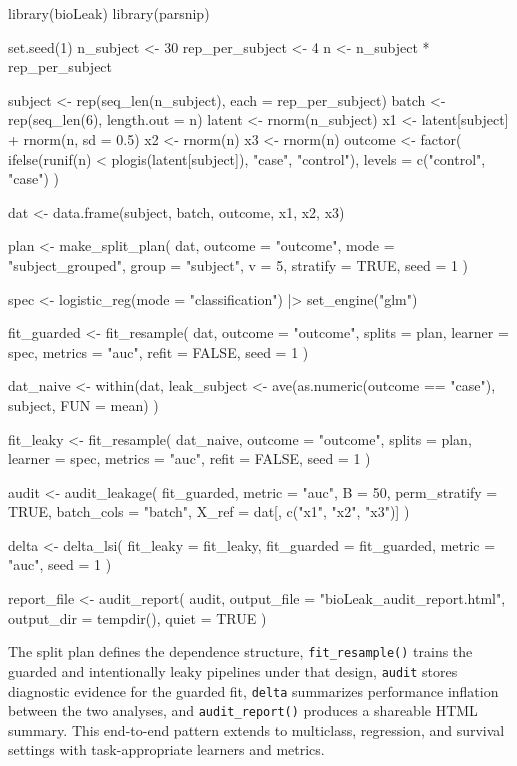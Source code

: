 \documentclass[article]{jss}
\begin{document}
\begin{CodeInput}
library(bioLeak)
library(parsnip)

set.seed(1)
n_subject <- 30
rep_per_subject <- 4
n <- n_subject * rep_per_subject

subject <- rep(seq_len(n_subject), each = rep_per_subject)
batch <- rep(seq_len(6), length.out = n)
latent <- rnorm(n_subject)
x1 <- latent[subject] + rnorm(n, sd = 0.5)
x2 <- rnorm(n)
x3 <- rnorm(n)
outcome <- factor(
  ifelse(runif(n) < plogis(latent[subject]), "case", "control"),
  levels = c("control", "case")
)

dat <- data.frame(subject, batch, outcome, x1, x2, x3)

plan <- make_split_plan(
  dat,
  outcome = "outcome",
  mode = "subject_grouped",
  group = "subject",
  v = 5,
  stratify = TRUE,
  seed = 1
)

spec <- logistic_reg(mode = "classification") |>
  set_engine("glm")

fit_guarded <- fit_resample(
  dat,
  outcome = "outcome",
  splits = plan,
  learner = spec,
  metrics = "auc",
  refit = FALSE,
  seed = 1
)

dat_naive <- within(dat, {
  leak_subject <- ave(as.numeric(outcome == "case"), subject, FUN = mean)
})

fit_leaky <- fit_resample(
  dat_naive,
  outcome = "outcome",
  splits = plan,
  learner = spec,
  metrics = "auc",
  refit = FALSE,
  seed = 1
)

audit <- audit_leakage(
  fit_guarded,
  metric = "auc",
  B = 50,
  perm_stratify = TRUE,
  batch_cols = "batch",
  X_ref = dat[, c("x1", "x2", "x3")]
)

delta <- delta_lsi(
  fit_leaky = fit_leaky,
  fit_guarded = fit_guarded,
  metric = "auc",
  seed = 1
)

report_file <- audit_report(
  audit,
  output_file = "bioLeak_audit_report.html",
  output_dir = tempdir(),
  quiet = TRUE
)
\end{CodeInput}

\noindent
The split plan defines the dependence structure, \texttt{fit\_resample()} trains the guarded and intentionally leaky pipelines under that design, \texttt{audit} stores diagnostic evidence for the guarded fit, \texttt{delta} summarizes performance inflation between the two analyses, and \texttt{audit\_report()} produces a shareable HTML summary. This end-to-end pattern extends to multiclass, regression, and survival settings with task-appropriate learners and metrics.
\end{document}

